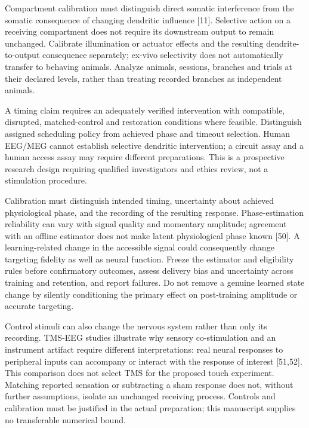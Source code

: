 \documentclass[
  american,
  11pt,
  letterpaper,
]{article}
\begin{document}
Compartment calibration must distinguish direct somatic interference from the somatic consequence of changing dendritic influence {[}11{]}. Selective action on a receiving compartment does not require its downstream output to remain unchanged. Calibrate illumination or actuator effects and the resulting dendrite-to-output consequence separately; ex-vivo selectivity does not automatically transfer to behaving animals. Analyze animals, sessions, branches and trials at their declared levels, rather than treating recorded branches as independent animals.

A timing claim requires an adequately verified intervention with compatible, disrupted, matched-control and restoration conditions where feasible. Distinguish assigned scheduling policy from achieved phase and timeout selection. Human EEG/MEG cannot establish selective dendritic intervention; a circuit assay and a human access assay may require different preparations. This is a prospective research design requiring qualified investigators and ethics review, not a stimulation procedure.

Calibration must distinguish intended timing, uncertainty about achieved physiological phase, and the recording of the resulting response. Phase-estimation reliability can vary with signal quality and momentary amplitude; agreement with an offline estimator does not make latent physiological phase known {[}50{]}. A learning-related change in the accessible signal could consequently change targeting fidelity as well as neural function. Freeze the estimator and eligibility rules before confirmatory outcomes, assess delivery bias and uncertainty across training and retention, and report failures. Do not remove a genuine learned state change by silently conditioning the primary effect on post-training amplitude or accurate targeting.

Control stimuli can also change the nervous system rather than only its recording. TMS-EEG studies illustrate why sensory co-stimulation and an instrument artifact require different interpretations: real neural responses to peripheral inputs can accompany or interact with the response of interest {[}51,52{]}. This comparison does not select TMS for the proposed touch experiment. Matching reported sensation or subtracting a sham response does not, without further assumptions, isolate an unchanged receiving process. Controls and calibration must be justified in the actual preparation; this manuscript supplies no transferable numerical bound.
\end{document}
